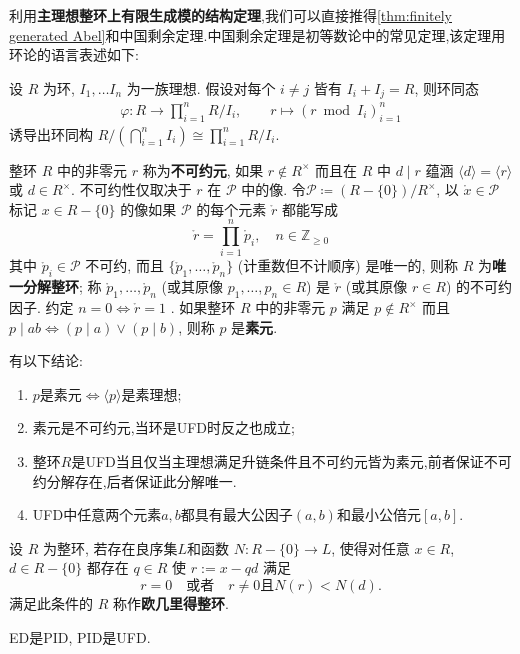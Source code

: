 利用\textbf{主理想整环上有限生成模的结构定理},我们可以直接推得\ref{thm:finitely generated Abel}和中国剩余定理.中国剩余定理是初等数论中的常见定理,该定理用环论的语言表述如下:
\begin{theorem}[中国剩余定理]\label{prop:CRT}
	设 $R$ 为环, $I_1, \ldots I_n$ 为一族理想. 假设对每个 $i \neq j$ 皆有 $I_i + I_j = R$, 则环同态
	\begin{align*}
		\varphi: R \to \prod_{i=1}^n R/I_i, \qquad r \mapsto \left( r \bmod I_i \right)_{i=1}^n
	\end{align*}
	诱导出环同构 $R \big/ (\bigcap_{i=1}^n I_i) \cong \prod_{i=1}^n R/I_i$.
\end{theorem}
\begin{definition}\label{def:UFD}
	整环 $R$ 中的非零元 $r$ 称为\textbf{不可约元}, 如果 $r \notin R^\times$ 而且在 $R$ 中 $d \mid r$ 蕴涵 $\langle d\rangle = \langle r\rangle$ 或 $d \in R^\times$. 不可约性仅取决于 $r$ 在 $\mathcal{P}$ 中的像. 令$\mathcal{P}\coloneqq(R - \{0\})/R^\times$, 以 $\mathring{x} \in \mathcal{P}$ 标记 $x \in R - \{0\}$ 的像如果 $\mathcal{P}$ 的每个元素 $\mathring{r}$ 都能写成
	\[ \mathring{r} = \prod_{i=1}^n \mathring{p}_i, \quad n \in \mathbb{Z}_{\geq 0} \]
	其中 $\mathring{p}_i \in \mathcal{P}$ 不可约, 而且 $\{\mathring{p}_1, \dots, \mathring{p}_n \}$ (计重数但不计顺序) 是唯一的, 则称 $R$ 为\textbf{唯一分解整环}; 称 $\mathring{p}_1, \dots, \mathring{p}_n$ (或其原像 $p_1, \dots, p_n \in R$) 是 $\mathring{r}$ (或其原像 $r \in R$) 的不可约因子. 约定 $n=0\iff{\mathring{r}}=1$ .
	如果整环 $R$ 中的非零元 $p$ 满足 $p \notin R^\times$ 而且 $p \mid ab \iff (p \mid a) \vee (p \mid b)$, 则称 $p$ 是\textbf{素元}. 
\end{definition}

有以下结论:
\begin{enumerate}
	\item $p$是素元$\iff \langle p\rangle$是素理想;
	\item 素元是不可约元,当环是UFD时反之也成立;
	\item 整环$R$是UFD当且仅当主理想满足升链条件且不可约元皆为素元,前者保证不可约分解存在,后者保证此分解唯一.
	\item UFD中任意两个元素$a,b$都具有最大公因子$(a,b)$和最小公倍元$[a,b]$.
\end{enumerate}
\begin{definition}\label{def:Euclidean-ring}
	设 $R$ 为整环, 若存在良序集$L$和函数 $N: R - \{0\} \to L$, 使得对任意 $x \in R$, $d \in R - \{0\}$ 都存在 $q \in R$ 使 $r := x-qd$ 满足 
	\[ r=0  \quad \text{或者}\quad r \neq 0 \text{且} N(r) < N(d). \]
	满足此条件的 $R$ 称作\textbf{欧几里得整环}.
\end{definition}
\begin{proposition}
	ED是PID, PID是UFD.
\end{proposition}

